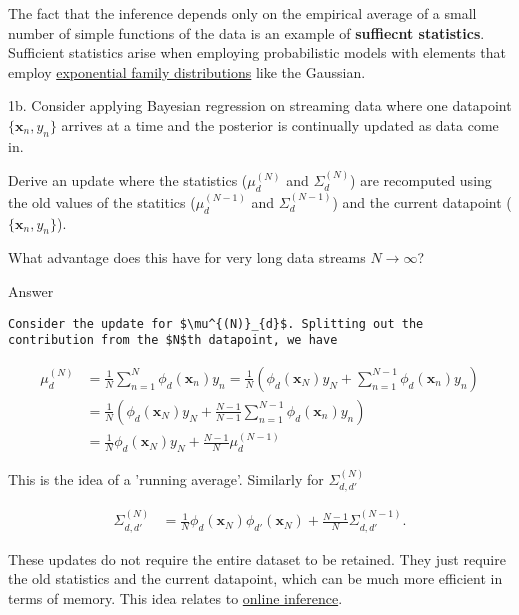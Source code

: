 \documentclass[11pt]{article}
\begin{document}
The fact that the inference depends only on the empirical average of a
small number of simple functions of the data is an example of
\textbf{suffiecnt statistics}. Sufficient statistics arise when
employing probabilistic models with elements that employ
\href{https://en.wikipedia.org/wiki/Exponential_family}{exponential
family distributions} like the Gaussian.

1b. Consider applying Bayesian regression on streaming data where one
datapoint \(\{ \mathbf{x}_n, y_n\}\) arrives at a time and the posterior
is continually updated as data come in.

Derive an update where the statistics (\(\mu^{(N)}_{d}\) and
\(\Sigma^{(N)}_d\)) are recomputed using the old values of the statitics
(\(\mu^{(N-1)}_{d}\) and \(\Sigma^{(N-1)}_d\)) and the current datapoint
(\(\{ \mathbf{x}_n, y_n\}\)).

What advantage does this have for very long data streams
\(N \rightarrow \infty\)?

 Answer

\begin{verbatim}
Consider the update for $\mu^{(N)}_{d}$. Splitting out the contribution from the $N$th datapoint, we have  
\end{verbatim}

\begin{align}
\mu^{(N)}_{d} &= \frac{1}{N}\sum_{n=1}^N \phi_d(\mathbf{x}_n) y_n = \frac{1}{N} \left(\phi_d(\mathbf{x}_N) y_N + \sum_{n=1}^{N-1} \phi_d(\mathbf{x}_n) y_n \right )\\ 
    &  = \frac{1}{N} \left(\phi_d(\mathbf{x}_N) y_N + \frac{N-1}{N-1}\sum_{n=1}^{N-1} \phi_d(\mathbf{x}_n) y_n \right)\\
    &  = \frac{1}{N} \phi_d(\mathbf{x}_N) y_N + \frac{N-1}{N} \mu^{(N-1)}_d
\end{align}

This is the idea of a 'running average'. Similarly for
\(\Sigma^{(N)}_{d,d'}\)

\begin{align}
\Sigma^{(N)}_{d,d'} &= \frac{1}{N} \phi_d(\mathbf{x}_N) \phi_{d'}(\mathbf{x}_N) + \frac{N-1}{N} \Sigma^{(N-1)}_{d,d'}. 
\end{align}

These updates do not require the entire dataset to be retained. They
just require the old statistics and the current datapoint, which can be
much more efficient in terms of memory. This idea relates to
\href{regression_bayesian-online-visualisations.ipynb}{online
inference}.


    
    
    
    
\end{document}

